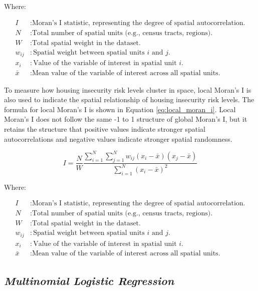 Where:

\begin{align*}
I & : \text{Moran's I statistic, representing the degree of spatial autocorrelation.} \\
N & : \text{Total number of spatial units (e.g., census tracts, regions).} \\
W & : \text{Total spatial weight in the dataset.} \\
w_{ij} & : \text{Spatial weight between spatial units \(i\) and \(j\).} \\
x_i & : \text{Value of the variable of interest in spatial unit \(i\).} \\
\bar{x} & : \text{Mean value of the variable of interest across all spatial units.}
\end{align*}

To measure how housing insecurity risk levels cluster in space, local Moran's I is also used to indicate the spatial relationship of housing insecurity risk levels. The formula for local Moran's I is shown in Equation \ref{eq:local_moran_i}. Local Moran's I does not follow the same -1 to 1 structure of global Moran's I, but it retains the structure that positive values indicate stronger spatial autocorrelations and negative values indicate stronger spatial randomness. 

\begin{equation}\label{eq:local_moran_i}
    I = \frac{N}{W} \frac{\sum_{i=1}^{N} \sum_{j=1}^{N} w_{ij} (x_i - \bar{x})(x_j - \bar{x})}{\sum_{i=1}^{N} (x_i - \bar{x})^2}
\end{equation}

Where:

\begin{align*}
I & : \text{Moran's I statistic, representing the degree of spatial autocorrelation.} \\
N & : \text{Total number of spatial units (e.g., census tracts, regions).} \\
W & : \text{Total spatial weight in the dataset.} \\
w_{ij} & : \text{Spatial weight between spatial units \(i\) and \(j\).} \\
x_i & : \text{Value of the variable of interest in spatial unit \(i\).} \\
\bar{x} & : \text{Mean value of the variable of interest across all spatial units.}
\end{align*}


\subsection{\textit{Multinomial Logistic Regression}}

